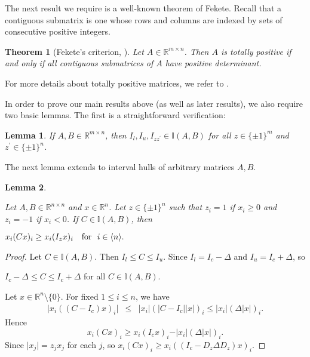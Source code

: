 \documentclass[11pt]{article}
\newtheorem{theorem}{Theorem}[section]
\newtheorem{lemma}{Lemma}[section]
\begin{document}
The next result we require is a well-known theorem of Fekete. Recall that
a contiguous submatrix is one whose rows and columns are indexed by sets of consecutive  positive integers.
		\begin{theorem}[Fekete's criterion, \cite{FP12}]\label{fec}
			Let $A \in \mathbb{R}^{m \times n}$. Then $A$ is
			totally positive if and only if all contiguous
			submatrices of $A$ have positive determinant.
		\end{theorem}

\noindent For more details about totally positive matrices, we refer to \cite{fallat-john,K68,pinkus}.


In order to prove our main results above (as well as later results), we also
require two basic lemmas. The first is a straightforward verification:

\begin{lemma}\label{int-lem1}
    If $A,B \in \mathbb{R}^{m \times n}$, then $I_l, I_u,
    I_{zz^\prime} \in \mathbb{I}(A,B)$ for all $z\in \{ \pm 1 \}^m$ and
    $z^{\prime}\in \{ \pm 1 \}^n$.
\end{lemma}



The next lemma extends \cite[Theorem 2.1]{RJRG} to interval hulls of
arbitrary matrices $A,B$.
\begin{lemma}\label{rohn_exten2}

    Let $A,B \in \mathbb{R}^{n \times n}$ and $x \in \mathbb{R}^n$. Let
    $z \in \{ \pm 1 \}^n$ such that $z_i = 1$ if $x_i \geq 0$ and $z_i = -1$ if $x_i < 0$. If $C \in \mathbb{I}(A,B)$, then
    \begin{center}
        $x_i(Cx)_i\geq x_i (I_z x)_i \hbox{~~ for ~} i\in \langle n \rangle.$
    \end{center}

\end{lemma}

\begin{proof}
    Let  $C \in \mathbb{I}(A,B)$. Then $I_l\leq C \leq I _u$. Since $I_l= I_c- \Delta$ and $I_u= I_c + \Delta$, so \begin{center} $I_c -\Delta \leq C \leq I_{c} + \Delta $ for all $C \in \mathbb{I}(A,B)$.\end{center} 
     Let $ x \in \mathbb{R}^n \setminus \{0\}$.  For fixed $1\leq i \leq n$, we have
    \begin{eqnarray}
    \vert   x_i((C-I_c)x)_i \vert & \leq &\vert x_i \vert (\vert C-I_c\vert \vert x \vert )_i
    \leq \vert x_i \vert ( \Delta  \vert x \vert )_i. \nonumber
    \end{eqnarray}
    Hence $$x_i (Cx)_i  \geq x_i (I_c x)_i - \vert x_i \vert ( \Delta  \vert x \vert )_i .$$
    Since $\vert x_j \vert=z_j x_j $ for each $j$, so $x_i (C x)_i \geq x_i((I_c - D_z \Delta D_z) x)_i$.
\end{proof}
\end{document}
